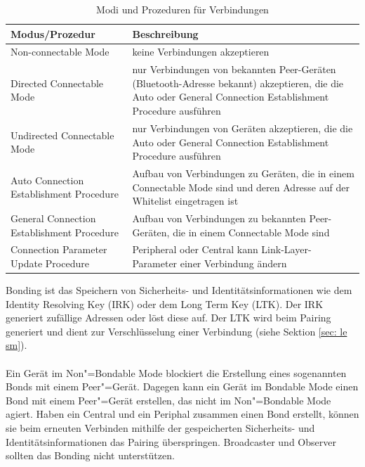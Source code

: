 \begin{table}
    \begin{tabularx}{\textwidth}{|p{4.5cm}|X|}
    \hline
    \textbf{Modus/Prozedur} & \textbf{Beschreibung} \\
    \hline
    Non-connectable Mode & keine Verbindungen akzeptieren \\
    \hline
    Directed Connectable Mode & nur Verbindungen von bekannten Peer-Geräten (Bluetooth-Adresse bekannt) akzeptieren, die die Auto oder General Connection Establishment Procedure ausführen \\
    \hline
    Undirected Connectable Mode & nur Verbindungen von Geräten akzeptieren, die die Auto oder General Connection Establishment Procedure ausführen \\
    \hline
    Auto Connection Establishment Procedure & Aufbau von Verbindungen zu Geräten, die in einem Connectable Mode sind und deren Adresse auf der Whitelist eingetragen ist \\
    \hline
    General Connection Establishment Procedure & Aufbau von Verbindungen zu bekannten Peer-Geräten, die in einem Connectable Mode sind \\
    \hline
    Connection Parameter Update Procedure & Peripheral oder Central kann Link-Layer-Parameter einer Verbindung ändern \\
    \hline
    \end{tabularx}
    \caption[Modi und Prozeduren für Verbindungen (GAP)]{Modi und Prozeduren für Verbindungen \cite{BtSpec4.0_1704-1718}}
    \label{tab: modi prodzeduren gap}
\end{table}

Bonding ist das Speichern von Sicherheits- und Identitätsinformationen wie dem Identity Resolving Key (IRK) oder dem Long Term Key (LTK). Der IRK generiert zufällige Adressen oder löst diese auf. Der LTK wird beim Pairing generiert und dient zur Verschlüsselung einer Verbindung (siehe Sektion \ref{sec: le sm}).
\\\\
Ein Gerät im Non"=Bondable Mode blockiert die Erstellung eines sogenannten Bonds mit einem Peer"=Gerät. Dagegen kann ein Gerät im Bondable Mode einen Bond mit einem Peer"=Gerät erstellen, das nicht im Non"=Bondable Mode agiert. Haben ein Central und ein Periphal zusammen einen Bond erstellt, können sie beim erneuten Verbinden mithilfe der gespeicherten Sicherheits- und Identitätsinformationen das Pairing überspringen. Broadcaster und Observer sollten das Bonding nicht unterstützen. \cite{BtSpec4.2_2060-2062}

